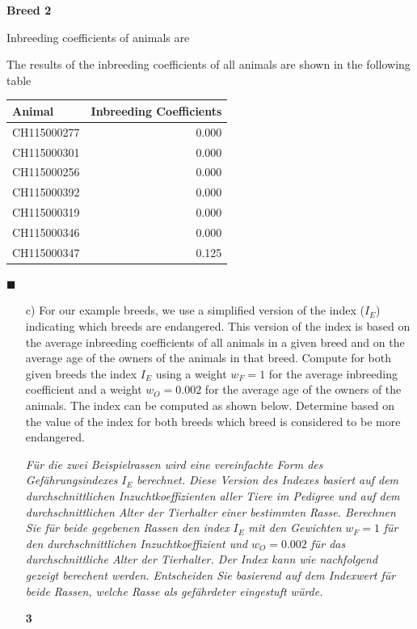 \documentclass[
]{article}
\newenvironment{Shaded}{\begin{snugshade}}{\end{snugshade}}
\newcommand{\AttributeTok}[1]{\textcolor[rgb]{0.77,0.63,0.00}{#1}}
\newcommand{\DecValTok}[1]{\textcolor[rgb]{0.00,0.00,0.81}{#1}}
\newcommand{\FunctionTok}[1]{\textcolor[rgb]{0.00,0.00,0.00}{#1}}
\newcommand{\NormalTok}[1]{#1}
\newcommand{\OtherTok}[1]{\textcolor[rgb]{0.56,0.35,0.01}{#1}}
\newcommand{\SpecialCharTok}[1]{\textcolor[rgb]{0.00,0.00,0.00}{#1}}
\newcommand{\StringTok}[1]{\textcolor[rgb]{0.31,0.60,0.02}{#1}}
\newcommand{\points}[1]
{\begin{flushright}\textbf{#1}\end{flushright}}
\newcommand{\solend}
{\vspace{2ex}$\blacksquare$}
\begin{document}
\textbf{Breed 2}

Inbreeding coefficients of animals are

\begin{Shaded}
\end{Shaded}

The results of the inbreeding coefficients of all animals are shown in
the following table

\begin{longtable}[]{@{}lr@{}}
\toprule()
Animal & Inbreeding Coefficients \\
\midrule()
\endhead
CH115000277 & 0.000 \\
CH115000301 & 0.000 \\
CH115000256 & 0.000 \\
CH115000392 & 0.000 \\
CH115000319 & 0.000 \\
CH115000346 & 0.000 \\
CH115000347 & 0.125 \\
\bottomrule()
\end{longtable}

\solend

\clearpage
\pagebreak

\begin{enumerate}
\item[c)] For our example breeds, we use a simplified version of the index ($I_E$) indicating which breeds are endangered. This version of the index is based on the average inbreeding coefficients of all animals in a given breed and on the average age of the owners of the animals in that breed. Compute for both given breeds the index $I_E$ using a weight $w_F = 1$ for the average inbreeding coefficient and a weight $w_O = 0.002$ for the average age of the owners of the animals. The index can be computed as shown below. Determine based on the value of the index for both breeds which breed is considered to be more endangered.

\textit{Für die zwei Beispielrassen wird eine vereinfachte Form des Gefährungsindexes} $I_E$ \textit{ berechnet. Diese Version des Indexes basiert auf dem durchschnittlichen Inzuchtkoeffizienten aller Tiere im Pedigree und auf dem durchschnittlichen Alter der Tierhalter einer bestimmten Rasse. Berechnen Sie für beide gegebenen Rassen den index } $I_E$ \textit{ mit den Gewichten } $w_F = 1$ \textit{ für den durchschnittlichen Inzuchtkoeffizient und } $w_O = 0.002$ \textit{ für das durchschnittliche Alter der Tierhalter. Der Index kann wie nachfolgend gezeigt berechent werden. Entscheiden Sie basierend auf dem Indexwert für beide Rassen, welche Rasse als gefährdeter eingestuft würde.}
\points{3}
\end{enumerate}
\end{document}
